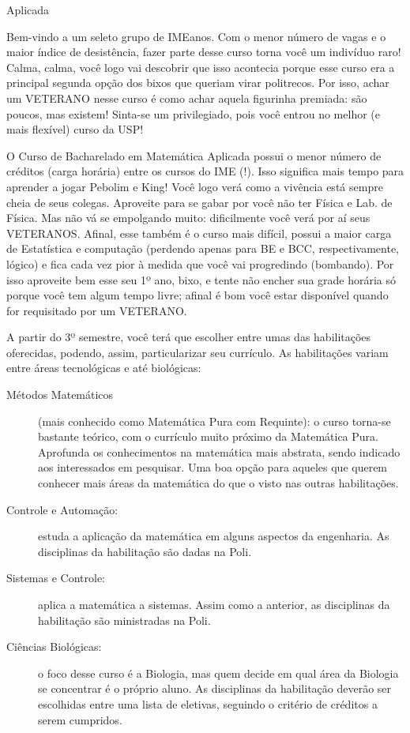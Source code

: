 \begin{subsecao}{Aplicada}

Bem-vindo a um seleto grupo de IMEanos. Com o menor número de vagas e o
maior índice de desistência, fazer parte desse curso torna você um indivíduo
raro! Calma, calma, você logo vai descobrir que isso acontecia porque esse curso
era a principal segunda opção dos bixos que queriam virar politrecos. Por
isso, achar um VETERANO nesse curso é como achar aquela figurinha premiada: são
poucos, mas existem! Sinta-se um privilegiado, pois você entrou no melhor (e
mais flexível) curso da USP!

O Curso de Bacharelado em Matemática Aplicada possui o menor número de
créditos (carga horária) entre os cursos do IME (!). Isso significa mais tempo
para aprender a jogar Pebolim e King! Você logo verá como a vivência está sempre
 cheia de seus colegas.
Aproveite para se gabar por você não ter Física e Lab. de
Física. Mas não vá se empolgando muito: dificilmente você verá por aí seus
VETERANOS. Afinal, esse também é o curso mais difícil, possui a maior carga de
Estatística e computação (perdendo apenas para BE e BCC, respectivamente,
lógico) e fica cada vez pior à medida que você vai progredindo (bombando). Por
isso aproveite bem esse seu 1º ano, bixo, e tente não encher sua grade
horária só porque você tem algum tempo livre; afinal é bom você estar
disponível quando for requisitado por um VETERANO.

A partir do 3º semestre, você terá que escolher entre umas das habilitações
oferecidas, podendo, assim, particularizar seu currículo. As habilitações
variam entre áreas tecnológicas e até biológicas:
\begin{description}
\item [Métodos Matemáticos] (mais conhecido como Matemática Pura com Requinte):
o curso torna-se bastante teórico, com o currículo muito próximo da Matemática
Pura. Aprofunda os conhecimentos na matemática mais abstrata, sendo indicado aos interessados em pesquisar. Uma boa opção para aqueles que
querem conhecer mais áreas da matemática do que o visto nas outras habilitações.
\item [Controle e Automação:] estuda a aplicação da matemática em alguns
aspectos da engenharia. As disciplinas da habilitação são dadas na Poli.
\item  [Sistemas e Controle:] aplica a matemática a sistemas. Assim como a
anterior, as disciplinas da habilitação são ministradas na Poli.
\item  [Ciências Biológicas:] o foco desse curso é a Biologia, mas quem
decide em qual área da Biologia se concentrar é o próprio aluno. As disciplinas da
habilitação deverão ser escolhidas entre uma lista de eletivas, seguindo o
critério de créditos a serem cumpridos.
\end{description}


\end{subsecao}
